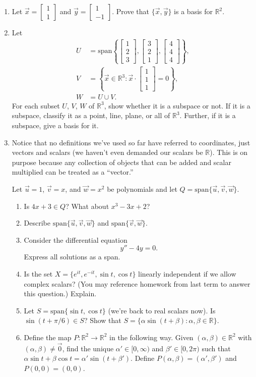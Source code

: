 \documentclass[letter]{article}
\newcommand{\R}{\mathbb{R}}
\newcommand{\Span}{\mathrm{span}}
\newcommand{\mat}[1]{\begin{bmatrix}#1\end{bmatrix}}
\begin{document}
\begin{enumerate}
\begin{enumerate}
			\end{enumerate}
		
		\item Let $\vec x=\mat{1\\1}$ and $\vec y=\mat{1\\-1}$.  Prove that $\{\vec x,\vec y\}$ is a 
			basis for $\R^2$.

		\item Let 
			\begin{align*}
				U&=\Span\left\{\mat{1\\2\\3},\mat{3\\2\\1},\mat{4\\4\\4}\right\},\\
				V&=\left\{\vec x\in\R^3:\vec x\cdot\mat{1\\1\\1}=0\right\},\\
				W&=U\cup V.
			\end{align*}
			For each subset $U$, $V$, $W$ of $\R^3$, show whether it is a subspace or not.  If it is a subspace,
			classify it as a point, line, plane, or all of $\R^3$.  Further, if it is a subspace, give a basis
			for it.
		\item Notice that no definitions we've used so far have referred to coordinates, just vectors
			and scalars (we haven't even demanded our scalars be $\R$).  This is on purpose
			because any collection of objects that can be added and scalar multiplied can be 
			treated as a ``vector.''
			
			Let $\vec u=1$, $\vec v = x$, and $\vec w = x^2$ be polynomials and let $Q=\Span\{\vec u,\vec v,\vec w\}$.
			
			\begin{enumerate}
				\item Is $4x+3\in Q$? What about $x^3-3x+2$?
				\item Describe $\Span\{\vec u,\vec v,\vec w\}$ and $\Span\{\vec v,\vec w\}$.
				\item Consider the differential equation
					\[
						y''-4y=0.
					\]
					Express all solutions as a span.
				\item Is the set $X=\{e^{it}, e^{-it}, \sin t, \cos t\}$ linearly independent if we allow
					complex scalars?  (You may reference homework from last term to answer this question.)
					Explain.
				\item Let $S=\Span\{\sin t,\cos t\}$ (we're back to real scalars now).  Is $\sin(t+\pi/6)\in S$?  Show that $S=\{\alpha\sin(t+\beta):\alpha,\beta\in \R\}$.
				\item Define the map $P:\R^2\to\R^2$ in the following way.  Given $(\alpha,\beta)\in \R^2$ with 
					$(\alpha,\beta)\neq \vec 0$, find the 
					unique $\alpha'\in [0,\infty)$
					and $\beta'\in[0,2\pi)$ such that $\alpha\sin t+\beta\cos t = \alpha'\sin(t+\beta')$.
						Define $P(\alpha,\beta)=(\alpha',\beta')$ and $P(0,0)=(0,0)$.


\end{enumerate}
\end{enumerate}
\end{document}
